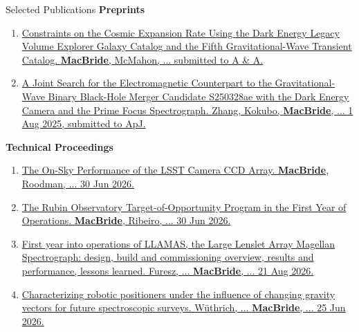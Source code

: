 \begin{rSection}{Selected Publications}
\textbf{Preprints}
\begin{enumerate}
    \item \href{}{Constraints on the Cosmic Expansion Rate Using the Dark Energy Legacy Volume Explorer Galaxy Catalog and the Fifth Gravitational-Wave Transient Catalog. \textbf{MacBride}, McMahon, ... submitted to A \& A.}
    \item \href{https://arxiv.org/abs/2508.00291}{A Joint Search for the Electromagnetic Counterpart to the Gravitational-Wave Binary Black-Hole Merger Candidate S250328ae with the Dark Energy Camera and the Prime Focus Spectrograph. Zhang, Kokubo, \textbf{MacBride}, ... 1 Aug 2025, submitted to ApJ.}
\end{enumerate}
    \newpage
\textbf{Technical Proceedings}
\begin{enumerate}
    \item \href{https://arxiv.org/abs/2606.31806}{The On-Sky Performance of the LSST Camera CCD Array. \textbf{MacBride}, Roodman, ... 30 Jun 2026.}
    \item \href{https://arxiv.org/abs/2607.00217}{The Rubin Observatory Target-of-Opportunity Program in the First Year of Operations. \textbf{MacBride}, Ribeiro, ... 30 Jun 2026.}
    \item \href{https://www.spiedigitallibrary.org/conference-proceedings-of-spie/14149/141491L/First-year-of-LLAMAS-the-large-lenslet-array-Magellan-spectrograph/10.1117/12.3104300.short}{First year into operations of LLAMAS, the Large Lenslet Array Magellan Spectrograph: design, build and commissioning overview, results and performance, lessons learned. Furesz, ... \textbf{MacBride}, ... 21 Aug 2026.}
    \item  \href{https://arxiv.org/pdf/2606.26821}{Characterizing robotic positioners under the influence of changing gravity vectors for future spectroscopic surveys. Wüthrich, ... \textbf{MacBride}, ... 25 Jun 2026.}

\end{enumerate}
\end{rSection}
